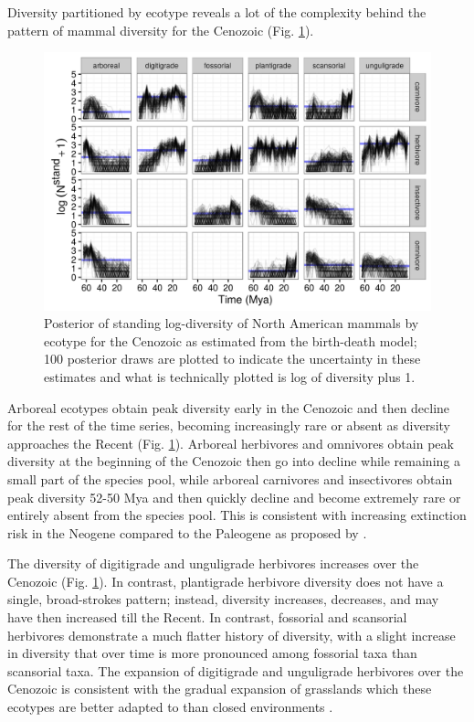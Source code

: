 \documentclass[12pt,letterpaper]{article}
\begin{document}
Diversity partitioned by ecotype reveals a lot of the complexity behind the pattern of mammal diversity for the Cenozoic (Fig. \ref{fig:ecotype_diversity}). 

\begin{figure}[ht]
  \centering
  \includegraphics[width=\textwidth,height=0.4\textheight,keepaspectratio=true]{figure/ecotype_diversity}
  \caption[Estimated mammal ecotype log-diversity for the Cenozoic]{Posterior of standing log-diversity of North American mammals by ecotype for the Cenozoic as estimated from the birth-death model; 100 posterior draws are plotted to indicate the uncertainty in these estimates and what is technically plotted is log of diversity plus 1.}
  \label{fig:ecotype_diversity}
\end{figure}

Arboreal ecotypes obtain peak diversity early in the Cenozoic and then decline for the rest of the time series, becoming increasingly rare or absent as diversity approaches the Recent (Fig. \ref{fig:ecotype_diversity}). Arboreal herbivores and omnivores obtain peak diversity at the beginning of the Cenozoic then go into decline while remaining a small part of the species pool, while arboreal carnivores and insectivores obtain peak diversity 52-50 Mya and then quickly decline and become extremely rare or entirely absent from the species pool. This is consistent with increasing extinction risk in the Neogene compared to the Paleogene as proposed by \citet{Smits2015b}.

The diversity of digitigrade and unguligrade herbivores increases over the Cenozoic (Fig. \ref{fig:ecotype_diversity}). In contrast, plantigrade herbivore diversity does not have a single, broad-strokes pattern; instead, diversity increases, decreases, and may have then increased till the Recent. In contrast, fossorial and scansorial herbivores demonstrate a much flatter history of diversity, with a slight increase in diversity that over time is more pronounced among fossorial taxa than scansorial taxa. The expansion of digitigrade and unguligrade herbivores over the Cenozoic is consistent with the gradual expansion of grasslands which these ecotypes are better adapted to than closed environments \citep{Blois2009,Stromberg2005}.
\end{document}
